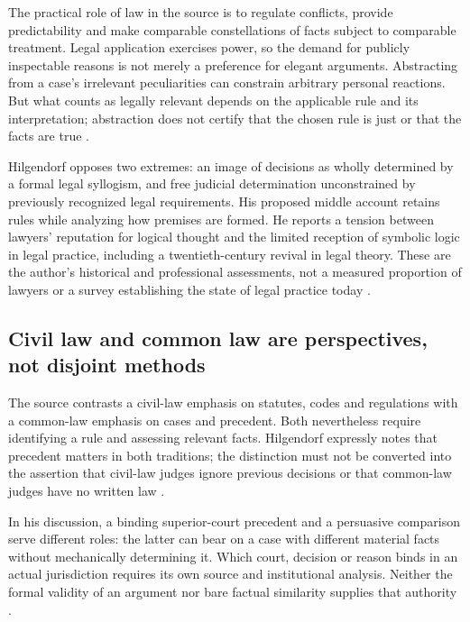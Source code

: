 The practical role of law in the source is to regulate conflicts, provide
predictability and make comparable constellations of facts subject to
comparable treatment. Legal application exercises power, so the demand for
publicly inspectable reasons is not merely a preference for elegant
arguments. Abstracting from a case's irrelevant peculiarities can constrain
arbitrary personal reactions. But what counts as legally relevant depends
on the applicable rule and its interpretation; abstraction does not certify
that the chosen rule is just or that the facts are true
\parencite[pp.~659--660]{Hilgendorf2021LegalLogic}.

Hilgendorf opposes two extremes: an image of decisions as wholly determined
by a formal legal syllogism, and free judicial determination unconstrained
by previously recognized legal requirements. His proposed middle account
retains rules while analyzing how premises are formed. He reports a tension
between lawyers' reputation for logical thought and the limited reception
of symbolic logic in legal practice, including a twentieth-century revival
in legal theory. These are the author's historical and professional
assessments, not a measured proportion of lawyers or a survey establishing
the state of legal practice today
\parencite[pp.~659--660]{Hilgendorf2021LegalLogic}.

\subsection{Civil law and common law are perspectives, not disjoint methods}

The source contrasts a civil-law emphasis on statutes, codes and regulations
with a common-law emphasis on cases and precedent. Both nevertheless require
identifying a rule and assessing relevant facts. Hilgendorf expressly notes
that precedent matters in both traditions; the distinction must not be
converted into the assertion that civil-law judges ignore previous decisions
or that common-law judges have no written law
\parencite[pp.~661--662, note~13 on p.~665]{Hilgendorf2021LegalLogic}.

In his discussion, a binding superior-court precedent and a persuasive
comparison serve different roles: the latter can bear on a case with
different material facts without mechanically determining it. Which court,
decision or reason binds in an actual jurisdiction requires its own source
and institutional analysis. Neither the formal validity of an argument nor
bare factual similarity supplies that authority
\parencite[note~28, pp.~665--666]{Hilgendorf2021LegalLogic}.


